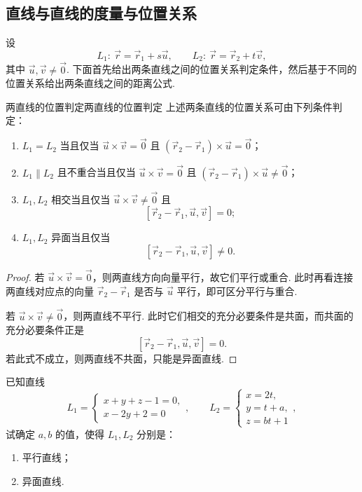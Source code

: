 \subsection{直线与直线的度量与位置关系}

设
\[
    L_1:\ \vec{r} = \vec{r}_1 + s \vec{u}, \qquad
    L_2:\ \vec{r} = \vec{r}_2 + t \vec{v},
\]
其中 $\vec{u}, \vec{v} \neq \vec{0}$. 下面首先给出两条直线之间的位置关系判定条件，然后基于不同的位置关系给出两条直线之间的距离公式.

\begin{theorem}{两直线的位置判定}{两直线的位置判定}
    上述两条直线的位置关系可由下列条件判定：
    \begin{enumerate}
        \item $L_1 = L_2$ 当且仅当 $\vec{u}\times\vec{v} = \vec{0}$ 且 $(\vec{r}_2 - \vec{r}_1)\times\vec{u} = \vec{0}$；
        \item $L_1 \parallel L_2$ 且不重合当且仅当 $\vec{u}\times\vec{v} = \vec{0}$ 且 $(\vec{r}_2 - \vec{r}_1)\times\vec{u} \neq \vec{0}$；
        \item $L_1, L_2$ 相交当且仅当 $\vec{u}\times\vec{v} \neq \vec{0}$ 且
              \[
                  [\vec{r}_2 - \vec{r}_1, \vec{u}, \vec{v}] = 0;
              \]
        \item $L_1, L_2$ 异面当且仅当
              \[
                  [\vec{r}_2 - \vec{r}_1, \vec{u}, \vec{v}] \neq 0.
              \]
    \end{enumerate}
\end{theorem}

\begin{proof}
    若 $\vec{u}\times\vec{v} = \vec{0}$，则两直线方向向量平行，故它们平行或重合. 此时再看连接两直线对应点的向量 $\vec{r}_2 - \vec{r}_1$ 是否与 $\vec{u}$ 平行，即可区分平行与重合.

    若 $\vec{u}\times\vec{v} \neq \vec{0}$，则两直线不平行. 此时它们相交的充分必要条件是共面，而共面的充分必要条件正是
    \[
        [\vec{r}_2 - \vec{r}_1, \vec{u}, \vec{v}] = 0.
    \]
    若此式不成立，则两直线不共面，只能是异面直线.
\end{proof}

\begin{example}{}{}
    已知直线
    \[
        L_1 =
        \begin{cases}
            x + y + z - 1 = 0, \\
            x - 2y + 2 = 0
        \end{cases},
        \qquad
        L_2 =
        \begin{cases}
            x = 2t, \\
            y = t + a, \\
            z = bt + 1
        \end{cases},
    \]
    试确定 $a, b$ 的值，使得 $L_1, L_2$ 分别是：
    \begin{enumerate}
        \item 平行直线；
        \item 异面直线.
    \end{enumerate}
\end{example}

